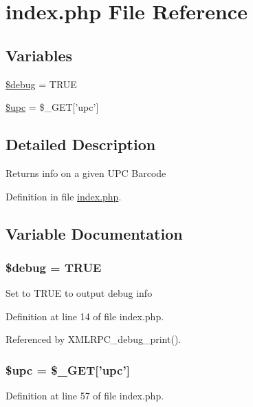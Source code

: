\hypertarget{index_8php}{
\section{index.php File Reference}
\label{index_8php}
}
\subsection*{Variables}
\begin{CompactItemize}
\item 
\hyperlink{index_8php_85ae3e64cd40e9564adceb010085e9dd}{\$debug} = TRUE
\item 
\hyperlink{index_8php_a9aa17ff51d69075d75cfc5bc4e89b34}{\$upc} = \$\_\-GET\mbox{[}'upc'\mbox{]}
\end{CompactItemize}


\subsection{Detailed Description}
Returns info on a given UPC Barcode 

Definition in file \hyperlink{index_8php-source}{index.php}.

\subsection{Variable Documentation}
\hypertarget{index_8php_85ae3e64cd40e9564adceb010085e9dd}{
\subsubsection{\setlength{\rightskip}{0pt plus 5cm}\$debug = TRUE}}
\label{index_8php_85ae3e64cd40e9564adceb010085e9dd}


Set to TRUE to output debug info 

Definition at line 14 of file index.php.

Referenced by XMLRPC\_\-debug\_\-print().\hypertarget{index_8php_a9aa17ff51d69075d75cfc5bc4e89b34}{
\subsubsection{\setlength{\rightskip}{0pt plus 5cm}\$upc = \$\_\-GET\mbox{[}'upc'\mbox{]}}}
\label{index_8php_a9aa17ff51d69075d75cfc5bc4e89b34}




Definition at line 57 of file index.php.